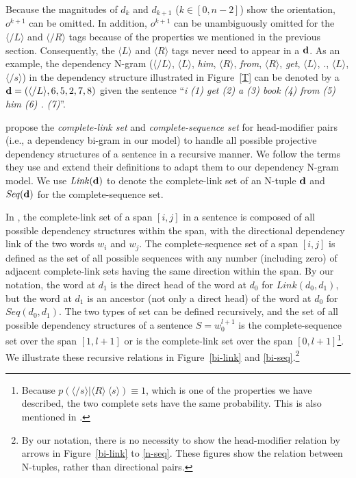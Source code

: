 \documentclass[english]{jnlp_1.4}
\begin{document}
Because the magnitudes of $d_k$ and $d_{k+1}$ ($k \in [0, n-2]$) show the orientation, $o^{k+1}$ can be omitted.
In addition, $o^{k+1}$ can be unambiguously omitted for the $\langle \slash L \rangle$ and $\langle \slash R \rangle$ tags because of the properties we mentioned in the previous section.
Consequently, the $\langle L \rangle$ and $\langle R \rangle$ tags never need to appear in a ${\bf{d}}$.
As an example, the dependency N-gram ($\langle \slash L \rangle$, $\langle L \rangle$, \emph{him}, $\langle R \rangle$, \emph{from}, $\langle R \rangle$, \emph{get}, $\langle L \rangle$, \emph{.}, $\langle L \rangle$, $\langle \slash s \rangle$) in the dependency structure illustrated in Figure~{\ref{T}} can be denoted by a ${\bf{d}} = (\langle \slash L \rangle, 6, 5, 2, 7, 8)$ given the sentence ``{\it{i (1) get (2) a (3) book (4) from (5) him (6) . (7)}}''.

\cite{lee1997} propose the {\it{complete-link set}} and {\it{complete-sequence set}} for head-modifier pairs (i.e., a dependency bi-gram in our model) to handle all possible projective dependency structures of a sentence in a recursive manner. We follow the terms they use and extend their definitions
to adapt them to our dependency N-gram model. 
We use $\mathit{Link} ({\bf{d}})$ to denote the complete-link set of an N-tuple ${\bf{d}}$ and $\mathit{Seq} ({\bf{d}})$ for the complete-sequence set.

In \cite{lee1997}, the complete-link set of a span $[i, j]$ in a sentence is composed of all possible dependency structures within the span, with the directional dependency link of the two words $w_i$ and $w_j$. The complete-sequence set of a span $[i, j]$ is defined as the set of all possible sequences with any number (including zero) of adjacent complete-link sets having the same direction within the span.
By our notation, the word at $d_1$ is the direct head of the word at $d_0$ for $\mathit{Link} (d_0, d_1)$, but the word at $d_1$ is an ancestor (not only a direct head) of the word at $d_0$ for $\mathit{Seq} (d_0, d_1)$.
The two types of set can be defined recursively, and the set of all possible dependency structures of a sentence $S=w_{0}^{l+1}$ is the complete-sequence set over the span $[1, l+1]$ or is the complete-link set over the span $[0, l+1]$\footnote{Because $p(\langle \slash s \rangle | \langle R \rangle\ \langle s \rangle) \equiv 1$, which is one of the properties we have described, the two complete sets have the same probability. This is also mentioned in \cite{lee1997}.}. We illustrate these recursive relations
in Figure~\ref{bi-link} and \ref{bi-seq}.\footnote{By our notation, there is no necessity to show the head-modifier relation by arrows in Figure~\ref{bi-link} to \ref{n-seq}. These figures show the relation between N-tuples, rather than directional pairs.}
\end{document}
